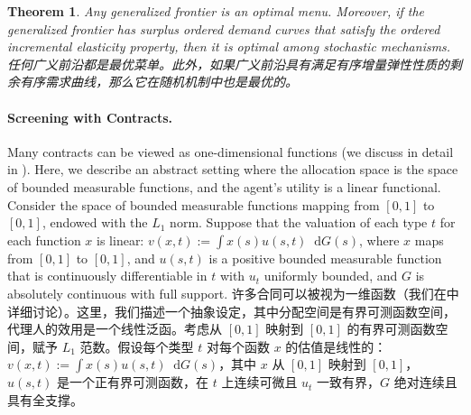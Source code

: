 \documentclass[12pt,letterpaper]{article}
\newenvironment{original}{\color{black}\noindent}{}
\newenvironment{translation}{\color{blue}\noindent}{}
\theoremstyle{plain}
\newtheorem{theorem}{Theorem}
\theoremstyle{definition}
\theoremstyle{remark}
\renewcommand{\1}{\mathds{1}}
\renewcommand*\d{\mathop{}\!\mathrm{d}}
\theoremstyle{definition}
\begin{document}
\begin{theorem}\label{thm:main3}
\begin{original}
Any generalized frontier is an optimal menu. Moreover, if the generalized frontier has surplus ordered demand curves that satisfy the ordered incremental elasticity property, then it is optimal among stochastic mechanisms.
\end{original}
\begin{translation}
任何广义前沿都是最优菜单。此外，如果广义前沿具有满足有序增量弹性性质的剩余有序需求曲线，那么它在随机机制中也是最优的。
\end{translation}
\end{theorem}

\paragraph{Screening with Contracts.}\hspace{-2mm}\begin{original}Many contracts can be viewed as one-dimensional functions (we discuss in detail in ). Here, we describe an abstract setting where the allocation space is the space of bounded measurable functions, and the agent's utility is a linear functional. Consider the space of bounded measurable functions mapping from $[0, 1]$ to $[0, 1]$, endowed with the $L_1$ norm. Suppose that the valuation of each type $t$ for each function $x$ is linear: $v(x, t) := \int x(s) u(s, t) \d G(s)$, where $x$ maps from $[0, 1]$ to $[0, 1]$, and $u(s, t)$ is a positive bounded measurable function that is continuously differentiable in $t$ with $u_t$ uniformly bounded, and $G$ is absolutely continuous with full support.
\end{original}
\begin{translation}
许多合同可以被视为一维函数（我们在中详细讨论）。这里，我们描述一个抽象设定，其中分配空间是有界可测函数空间，代理人的效用是一个线性泛函。考虑从 $[0, 1]$ 映射到 $[0, 1]$ 的有界可测函数空间，赋予 $L_1$ 范数。假设每个类型 $t$ 对每个函数 $x$ 的估值是线性的：$v(x, t) := \int x(s) u(s, t) \d G(s)$，其中 $x$ 从 $[0, 1]$ 映射到 $[0, 1]$，$u(s, t)$ 是一个正有界可测函数，在 $t$ 上连续可微且 $u_t$ 一致有界，$G$ 绝对连续且具有全支撑。
\end{translation}
\end{document}
